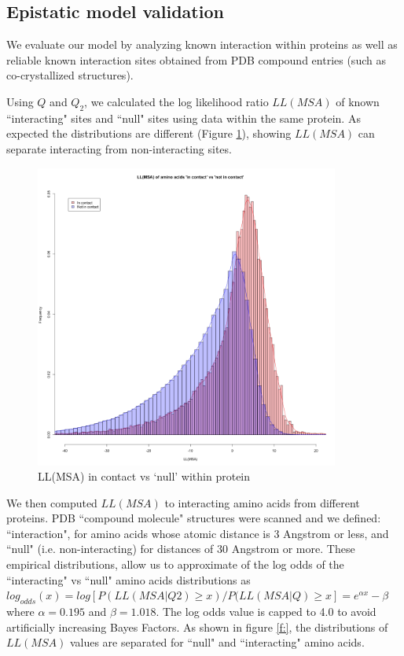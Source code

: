 \subsection{Epistatic model validation}

We evaluate our model by analyzing known interaction within proteins as well as reliable known interaction sites obtained from PDB compound entries (such as co-crystallized structures). 

Using $Q$ and $Q_2$, we calculated the log likelihood ratio $LL(MSA)$ of known ``interacting" sites and ``null" sites using data within the same protein. As expected the distributions are different (Figure \ref{fig:gwasf2}), showing $LL(MSA)$ can separate interacting from non-interacting sites.

\begin{figure}
    \centering
    \includegraphics[width=10cm]{gwas_figure_2.png}
    \caption{LL(MSA) in contact vs ‘null’ within protein}
    \label{fig:gwasf2}
\end{figure}

We then computed $LL(MSA)$ to interacting amino acids from  different proteins. PDB ``compound molecule" structures were scanned and we defined: ``interaction", for amino acids whose atomic distance is 3 Angstrom or less, and ``null" (i.e. non-interacting) for distances of 30 Angstrom or more. These empirical distributions, allow us to approximate of the log odds of the ``interacting" vs ``null" amino acids distributions as $log_{odds}(x) = log[P(LL(MSA|Q2) \ge x) / P(LL(MSA|Q) \ge x] = e^{\alpha x}-\beta$ where $\alpha = 0.195$ and $\beta = 1.018$. The log odds value is capped to 4.0 to avoid artificially increasing Bayes Factors. As shown in figure \ref{f:}, the distributions of $LL(MSA)$ values are separated for ``null" and ``interacting" amino acids. 

